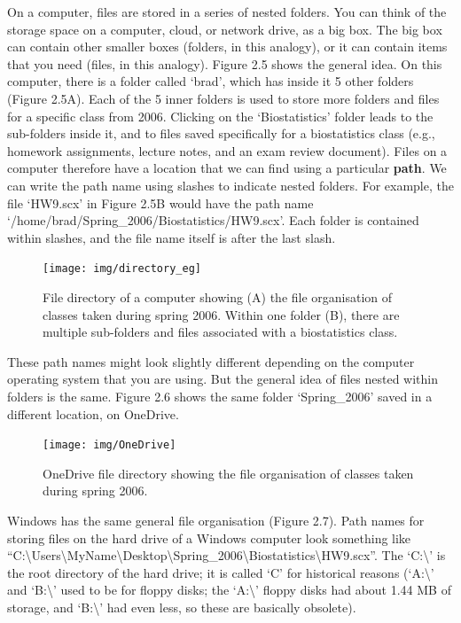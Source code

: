 \documentclass[
]{scrbook}
\begin{document}
On a computer, files are stored in a series of nested folders.
You can think of the storage space on a computer, cloud, or network drive, as a big box.
The big box can contain other smaller boxes (folders, in this analogy), or it can contain items that you need (files, in this analogy).
Figure 2.5 shows the general idea.
On this computer, there is a folder called `brad', which has inside it 5 other folders (Figure 2.5A).
Each of the 5 inner folders is used to store more folders and files for a specific class from 2006.
Clicking on the `Biostatistics' folder leads to the sub-folders inside it, and to files saved specifically for a biostatistics class (e.g., homework assignments, lecture notes, and an exam review document).
Files on a computer therefore have a location that we can find using a particular \textbf{path}.
We can write the path name using slashes to indicate nested folders.
For example, the file `HW9.scx' in Figure 2.5B would have the path name `/home/brad/Spring\_2006/Biostatistics/HW9.scx'.
Each folder is contained within slashes, and the file name itself is after the last slash.

\begin{figure}
\texttt{[image: img/directory\_eg]} \caption{File directory of a computer showing (A) the file organisation of classes taken during spring 2006. Within one folder (B), there are multiple sub-folders and files associated with a biostatistics class.}\label{fig:unnamed-chunk-7}
\end{figure}

These path names might look slightly different depending on the computer operating system that you are using.
But the general idea of files nested within folders is the same.
Figure 2.6 shows the same folder `Spring\_2006' saved in a different location, on OneDrive.

\begin{figure}
\texttt{[image: img/OneDrive]} \caption{OneDrive file directory showing the file organisation of classes taken during spring 2006.}\label{fig:unnamed-chunk-8}
\end{figure}

Windows has the same general file organisation (Figure 2.7).
Path names for storing files on the hard drive of a Windows computer look something like ``C:\textbackslash Users\textbackslash MyName\textbackslash Desktop\textbackslash Spring\_2006\textbackslash Biostatistics\textbackslash HW9.scx''.
The `C:\textbackslash{}' is the root directory of the hard drive; it is called `C' for historical reasons (`A:\textbackslash{}' and `B:\textbackslash{}' used to be for floppy disks; the `A:\textbackslash{}' floppy disks had about 1.44 MB of storage, and `B:\textbackslash{}' had even less, so these are basically obsolete).
\end{document}
